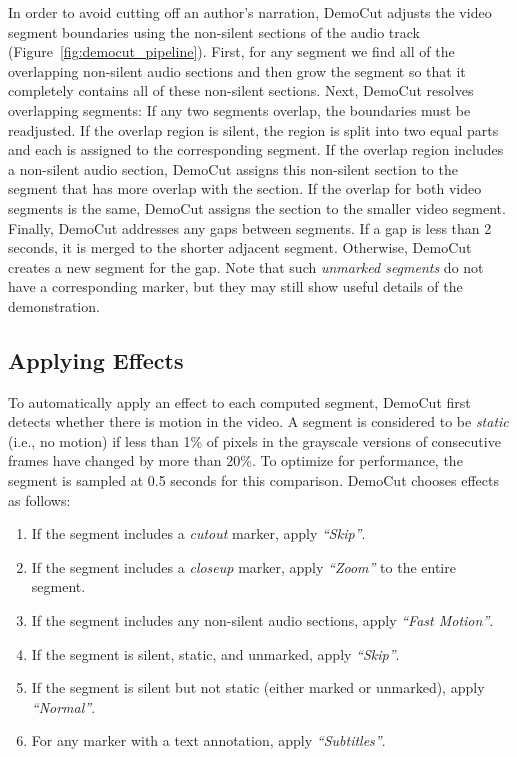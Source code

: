 In order to avoid cutting off an author's narration, DemoCut
adjusts the video segment boundaries using the non-silent sections
of the audio track (Figure~\ref{fig:democut_pipeline}). First, for any segment
we find all of the overlapping non-silent audio sections and then grow the
segment so that it completely contains all of these non-silent sections.
%
Next, DemoCut resolves overlapping segments: If any two segments
overlap,
the boundaries must be readjusted.
%
If the overlap region is silent, the region is split into two equal parts and each is assigned to the
corresponding segment.
%
If the overlap region includes a non-silent audio section,
DemoCut assigns this non-silent section to the segment that has
more overlap with the section. If the overlap for both video segments is the same, DemoCut assigns the section to the smaller video segment.
%
Finally, DemoCut addresses any gaps between segments. If a gap is less
than 2 seconds, it is merged to the shorter adjacent segment.
Otherwise, DemoCut creates a new segment for the gap. Note
that such {\em unmarked segments} do not have a corresponding marker, but
they may still show useful details of the demonstration.

\subsection{Applying Effects}

To automatically apply an effect to each
computed segment, DemoCut first detects whether
there is motion in the video. A segment is considered to be {\em static}
(i.e., no motion) if less than 1\% of pixels in the grayscale versions
of consecutive frames have changed by more than 20\%. To optimize for
performance, the segment is sampled at 0.5 seconds for this
comparison.
%
DemoCut chooses effects as follows:

\begin{enumerate}
  \item If the segment includes a \emph{cutout} marker, apply {\em ``Skip''}.
  \item If the segment includes a \emph{closeup} marker, apply {\em ``Zoom''} to the entire segment.
  \item If the segment includes any non-silent audio sections, apply {\em ``Fast Motion''}.
  \item If the segment is silent, static, and unmarked, apply {\em ``Skip''}.
  \item If the segment is silent but not static (either marked or unmarked), apply {\em ``Normal''}.
  \item For any marker with a text annotation, apply {\em ``Subtitles''}.

  \end{enumerate}

